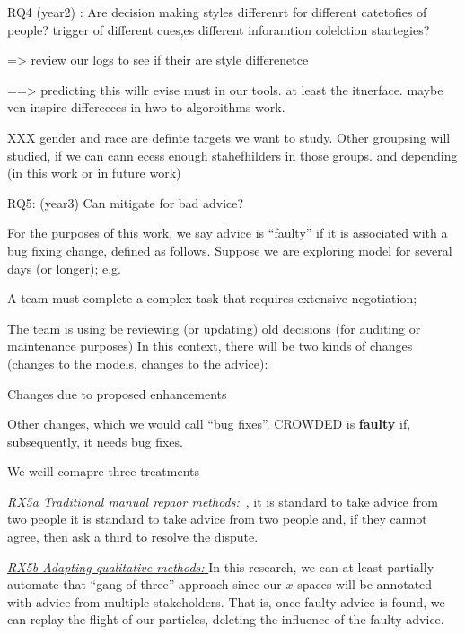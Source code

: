 
 
  RQ4 (year2) : Are
decision making styles differenrt for different catetofies of people? trigger of different cues,es different inforamtion colelction startegies?

=> review our logs to see if their are style differenetce

==> predicting this willr evise must in our tools. at least the itnerface. maybe ven inspire differeeces in hwo to algoroithms work.

XXX gender and race are definte  targets we want to study. Other groupsing will studied, if we can cann ecess enough stahefhilders in those groups. and depending  (in this work or in future work)

 
  RQ5: (year3) Can  mitigate for bad advice?


For the purposes of this work, we say
advice is ``faulty'' if it is associated with a bug fixing change, defined as follows.
Suppose we are   exploring
model   for   several days (or longer); e.g.
\bi
\item A team must complete a complex task that requires extensive negotiation;
\item The team is using be reviewing (or updating) old decisions (for auditing or maintenance purposes)
\ei
In this context, there will be two kinds of changes (changes to the models, changes to the advice):
\bi
\item
Changes due to proposed enhancements 
\item
Other changes,  which we would call ``bug fixes''.
CROWDED is 
\underline{\bf faulty} if,      subsequently, it needs   bug fixes.
\ei

We weill comapre three treatments 
 


\underline{\em RX5a Traditional manual
repaor  methods:}~\cite{Easterbrook08},
it is standard to   take advice from two people it is standard to   take advice from two people 
and, if they cannot agree, then ask a third to resolve the dispute.

\underline{\em RX5b Adapting qualitative methods: }
 In this research, we can at least partially automate that ``gang of three'' approach since our $x$ spaces will be annotated with advice from multiple stakeholders.  That is, once faulty advice is found, we can replay the flight of our particles, deleting the influence of the faulty advice.
 



